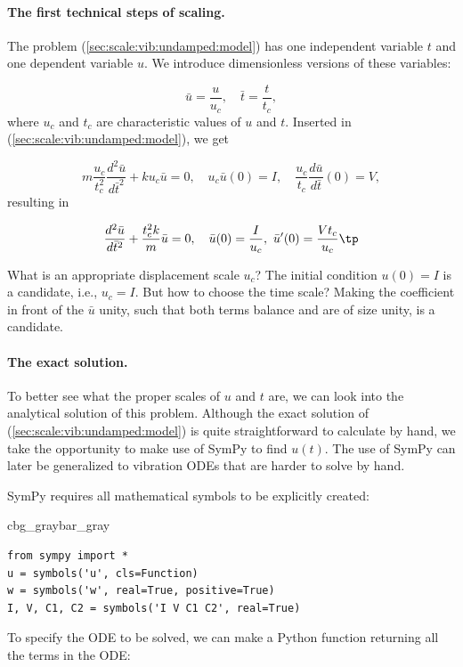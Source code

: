 \documentclass[graybox,envcountchap,sectrefs,final]{svmonodo}
\newenvironment{_pro_tight}[2]{
   \def\FrameCommand{\color{#2}\vrule width 1mm\normalcolor\colorbox{#1}}
   \FrameRule0.6pt\MakeFramed {\advance\hsize-2mm\FrameRestore}\vskip3mm}
   {\vskip0mm\endMakeFramed}
\newenvironment{pro}[2]{
\bgroup\rmfamily
\fboxsep=0mm\relax
\begin{_pro_tight}{#1}{#2}
\list{}{\parsep=-2mm\parskip=0mm\topsep=0pt\leftmargin=2mm
\rightmargin=2\leftmargin\leftmargin=4pt\relax}
\item\relax}
{\endlist\end{_pro_tight}\egroup}
\begin{document}
\paragraph{The first technical steps of scaling.}
The problem (\ref{sec:scale:vib:undamped:model}) has one independent
variable $t$ and one dependent variable $u$. We introduce dimensionless
versions of these variables:

\[ \bar u =\frac{u}{u_c},\quad\bar t = \frac{t}{t_c},\]
where $u_c$ and $t_c$ are characteristic values of $u$ and $t$.
Inserted in (\ref{sec:scale:vib:undamped:model}), we get

\[ m\frac{u_c}{t_c^2}\frac{d^2\bar u}{d\bar t^2} + ku_c\bar u = 0,
\quad u_c\bar u(0)=I,\quad \frac{u_c}{t_c}\frac{d\bar u}{d\bar t}(0)=V,\]
resulting in

\begin{equation}
\frac{d^2\bar u}{d\bar t^2} + \frac{t_c^2 k}{m}\bar u = 0,
\quad \bar u(0)=\frac{I}{u_c},\ \bar u'(0)=\frac{Vt_c}{u_c}\tp
\label{sec:scale:vib:undamped:model:scaled0}
\end{equation}

What is an appropriate displacement scale $u_c$? The initial condition
$u(0)=I$ is a candidate, i.e., $u_c=I$. But how to choose the time scale?
Making the coefficient in front of the $\bar u$ unity, such that
both terms balance and are of size unity, is a candidate.

\paragraph{The exact solution.}
To better see what the proper scales of $u$ and $t$ are, we can look
into the analytical solution of this problem.
Although the exact solution of
(\ref{sec:scale:vib:undamped:model}) is quite straightforward to calculate
by hand, we take the opportunity to make use of SymPy to
find $u(t)$. The use of SymPy can later be generalized to vibration
ODEs that are harder to solve by hand.

SymPy requires all mathematical symbols to be explicitly created:

\begin{pro}{cbg_gray}{bar_gray}\begin{Verbatim}[numbers=none,fontsize=\fontsize{9pt}{9pt},baselinestretch=0.95,xleftmargin=2mm]
from sympy import *
u = symbols('u', cls=Function)
w = symbols('w', real=True, positive=True)
I, V, C1, C2 = symbols('I V C1 C2', real=True)
\end{Verbatim}
\end{pro}
\noindent
To specify the ODE to be solved, we can make a Python function returning
all the terms in the ODE:
\end{document}

